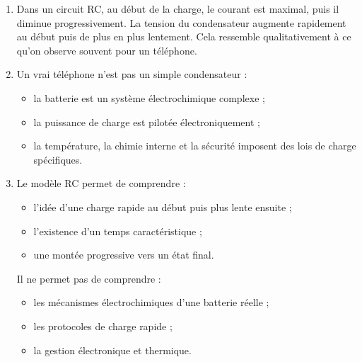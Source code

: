 \documentclass[11pt,a4paper]{article}
\begin{document}
\begin{corrigebox}
\begin{enumerate}[label=\alph*)]
    \item Dans un circuit RC, au début de la charge, le courant est maximal, puis il diminue progressivement. La tension du condensateur augmente rapidement au début puis de plus en plus lentement. Cela ressemble qualitativement à ce qu'on observe souvent pour un téléphone.

    \item Un vrai téléphone n'est pas un simple condensateur :
    \begin{itemize}
        \item la batterie est un système électrochimique complexe ;
        \item la puissance de charge est pilotée électroniquement ;
        \item la température, la chimie interne et la sécurité imposent des lois de charge spécifiques.
    \end{itemize}

    \item Le modèle RC permet de comprendre :
    \begin{itemize}
        \item l'idée d'une charge rapide au début puis plus lente ensuite ;
        \item l'existence d'un temps caractéristique ;
        \item une montée progressive vers un état final.
    \end{itemize}
    Il ne permet pas de comprendre :
    \begin{itemize}
        \item les mécanismes électrochimiques d'une batterie réelle ;
        \item les protocoles de charge rapide ;
        \item la gestion électronique et thermique.
    \end{itemize}
\end{enumerate}
\end{corrigebox}
\end{document}
